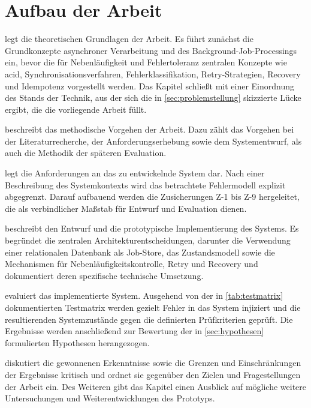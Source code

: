 \section{Aufbau der Arbeit}
\label{sec:aufbau}
 legt die theoretischen Grundlagen der Arbeit.
Es führt zunächst die Grundkonzepte asynchroner Verarbeitung und des Background-Job-Processings ein, bevor die für
Nebenläufigkeit und Fehlertoleranz zentralen Konzepte wie \gls{acid}, Synchronisationsverfahren, Fehlerklassifikation,
Retry-Strategien, Recovery und Idempotenz vorgestellt werden.
Das Kapitel schließt mit einer Einordnung des Stands der Technik, aus der sich die in \cref{sec:problemstellung}
skizzierte Lücke ergibt, die die vorliegende Arbeit füllt.

 beschreibt das methodische Vorgehen der Arbeit.
Dazu zählt das Vorgehen bei der Literaturrecherche, der Anforderungserhebung sowie dem Systementwurf, als auch die Methodik
der späteren Evaluation.

 legt die Anforderungen an das zu entwickelnde System dar.
Nach einer Beschreibung des Systemkontexts wird das betrachtete Fehlermodell explizit abgegrenzt.
Darauf aufbauend werden die Zusicherungen Z-1 bis Z-9 hergeleitet, die als verbindlicher Maßstab für Entwurf und Evaluation dienen.

 beschreibt den Entwurf und die prototypische Implementierung des Systems.
Es begründet die zentralen Architekturentscheidungen, darunter die Verwendung einer relationalen Datenbank als Job-Store, das
Zustandsmodell sowie die Mechanismen für Nebenläufigkeitskontrolle, Retry und Recovery und dokumentiert deren spezifische
technische Umsetzung.

 evaluiert das implementierte System.
Ausgehend von der in \cref{tab:testmatrix} dokumentierten Testmatrix werden gezielt Fehler in das System injiziert und
die resultierenden Systemzustände gegen die definierten Prüfkriterien geprüft.
Die Ergebnisse werden anschließend zur Bewertung der in \cref{sec:hypothesen} formulierten Hypothesen herangezogen.

 diskutiert die gewonnenen Erkenntnisse sowie die Grenzen und Einschränkungen der Ergebnisse kritisch und ordnet
sie gegenüber den Zielen und Fragestellungen der Arbeit ein.
Des Weiteren gibt das Kapitel einen Ausblick auf mögliche weitere Untersuchungen und Weiterentwicklungen des Prototyps.
